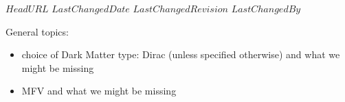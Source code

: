 \svnidlong
{$HeadURL$}
{$LastChangedDate$}
{$LastChangedRevision$}
{$LastChangedBy$}

General topics:
\begin{itemize}
 \item choice of Dark Matter type: Dirac (unless specified otherwise) and what we might be missing
 \item MFV and what we might be missing
\end{itemize}
